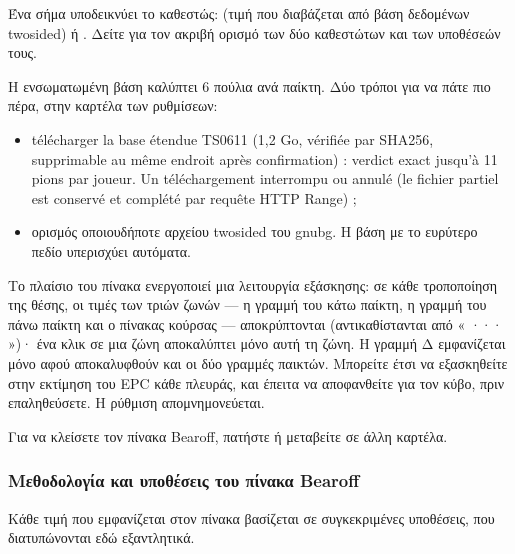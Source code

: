 \documentclass[letterpaper,10pt,greek]{sphinxmanual}
\begin{document}
\sphinxAtStartPar
Ένα σήμα υποδεικνύει το καθεστώς:  (τιμή που διαβάζεται από βάση δεδομένων two\sphinxhyphen{}sided) ή . Δείτε {\hyperref[\detokenize{manuel:epc-methodologie}]{}} για τον ακριβή ορισμό των δύο καθεστώτων και των υποθέσεών τους.

\sphinxAtStartPar
{} Η ενσωματωμένη βάση καλύπτει 6 πούλια ανά παίκτη. Δύο τρόποι για να πάτε πιο πέρα, στην καρτέλα  των ρυθμίσεων:
\begin{itemize}
\item {} 
\sphinxAtStartPar
télécharger la base étendue TS\sphinxhyphen{}06\sphinxhyphen{}11 (1,2 Go, vérifiée par SHA\sphinxhyphen{}256,
supprimable au même endroit après confirmation) : verdict exact jusqu’à
11 pions par joueur. Un téléchargement interrompu ou annulé  (le fichier partiel est conservé et complété par
requête HTTP Range) ;

\item {} 
\sphinxAtStartPar
ορισμός οποιουδήποτε αρχείου  two\sphinxhyphen{}sided του gnubg. Η βάση με το ευρύτερο πεδίο υπερισχύει αυτόματα.

\end{itemize}

\sphinxAtStartPar
{} Το πλαίσιο  του πίνακα ενεργοποιεί μια λειτουργία εξάσκησης: σε κάθε τροποποίηση της θέσης, οι τιμές των τριών ζωνών — η γραμμή του κάτω παίκτη, η γραμμή του πάνω παίκτη και ο πίνακας κούρσας — αποκρύπτονται (αντικαθίστανται από « ··· »)· ένα κλικ σε μια ζώνη αποκαλύπτει μόνο αυτή τη ζώνη. Η γραμμή Δ εμφανίζεται μόνο αφού αποκαλυφθούν και οι δύο γραμμές παικτών. Μπορείτε έτσι να εξασκηθείτε στην εκτίμηση του EPC κάθε πλευράς, και έπειτα να αποφανθείτε για τον κύβο, πριν επαληθεύσετε. Η ρύθμιση απομνημονεύεται.

\sphinxAtStartPar
Για να κλείσετε τον πίνακα Bearoff, πατήστε  ή μεταβείτε σε άλλη καρτέλα.


\subsubsection{Μεθοδολογία και υποθέσεις του πίνακα Bearoff}
\label{\detokenize{manuel:methodologie-et-hypotheses-du-panneau-bearoff}}\label{\detokenize{manuel:epc-methodologie}}
\sphinxAtStartPar
Κάθε τιμή που εμφανίζεται στον πίνακα βασίζεται σε συγκεκριμένες υποθέσεις, που διατυπώνονται εδώ εξαντλητικά.
\end{document}
